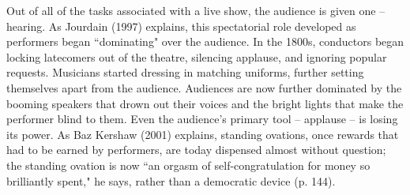 Out of all of the tasks associated with a live show, the audience is given one -- hearing. As Jourdain (1997) explains, this spectatorial role developed as performers began ``dominating" over the audience. In the 1800s, conductors began locking latecomers out of the theatre, silencing applause, and ignoring popular requests. Musicians started dressing in matching uniforms, further setting themselves apart from the audience. Audiences are now further dominated by the booming speakers that drown out their voices and the bright lights that make the performer blind to them. Even the audience's primary tool -- applause -- is losing its power. As Baz Kershaw (2001) explains, standing ovations, once rewards that had to be earned by performers, are today dispensed almost without question; the standing ovation is now ``an orgasm of self-congratulation for money so brilliantly spent," he says, rather than a democratic device (p. 144).

